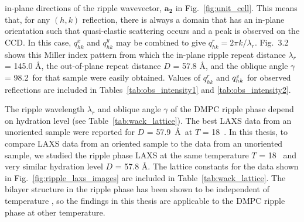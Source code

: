in-plane directions of the
ripple wavevector, $\mathbf{a_2}$ 
in Fig.~\ref{fig:unit_cell}. 
This means that, for any $(h,k)$ reflection, there is always a domain that has 
an in-plane orientation such that quasi-elastic scattering occurs and a peak 
is observed on the CCD.  
In this case, $q_{hk}^x$ and $q_{hk}^y$ may be combined to 
give $q_{hk}^r = 2\pi k/\lambda_r$.  
Fig.~3.2 shows this Miller index pattern from which the in-plane ripple repeat 
distance $\lambda_r$ = 145.0 \AA, the out-of-plane repeat distance 
$D$ = 57.8 \AA, and the oblique angle $\gamma$ = 98.2\textdegree\ for that 
sample were easily obtained.
Values of $q_{hk}^r$ and $q_{hk}^z$ for observed reflections are included
in Tables~\ref{tab:obs_intensity1} and \ref{tab:obs_intensity2}.

The ripple wavelength $\lambda_r$ and oblique angle $\gamma$ of the DMPC
ripple phase depend on hydration level \cite{ref:Wack89} 
(see Table~\ref{tab:wack_lattice}).
The best LAXS data from an unoriented sample were reported for $D$ = 57.9~\AA\ 
at $T$ = 18~\textcelsius. In this thesis, 
to compare LAXS data from an oriented sample to the data from 
an unoriented sample,
we studied the ripple phase LAXS at the same temperature $T$ = 18 \textcelsius\ 
and very similar hydration level $D$ = 57.8 \AA.
The lattice constants for the data shown in Fig.~\ref{fig:ripple_laxs_images} are 
included in Table~\ref{tab:wack_lattice}.
The bilayer structure in the ripple phase has been shown to be independent 
of temperature \cite{ref:Sengupta03}, so the findings in this thesis are
applicable to the DMPC ripple phase at other temperature.

